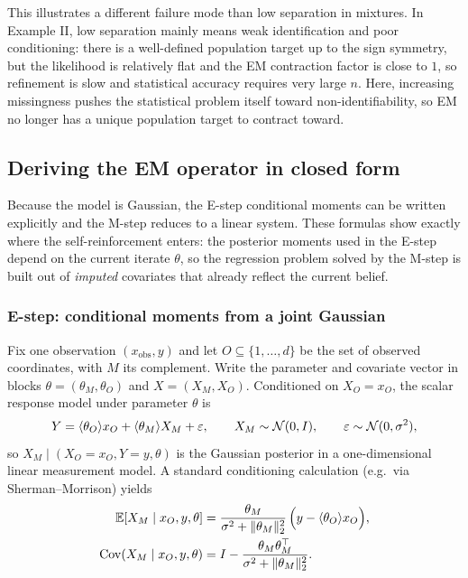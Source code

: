 \documentclass[11pt]{article}
\begin{document}
This illustrates a different failure mode than low separation in mixtures.
In Example II, low separation mainly means weak identification and poor conditioning: there is a well-defined population target up to the sign symmetry, but the likelihood is relatively flat and the EM contraction factor is close to $1$, so refinement is slow and statistical accuracy requires very large $n$.
Here, increasing missingness pushes the statistical problem itself toward non-identifiability, so EM no longer has a unique population target to contract toward.

\subsection{Deriving the EM operator in closed form}
\label{subsec:missing-covariates-derivation}

Because the model is Gaussian, the E-step conditional moments can be written explicitly and the M-step reduces to a linear system.
These formulas show exactly where the self-reinforcement enters:
the posterior moments used in the E-step depend on the current iterate $\theta$, so the regression problem solved by the M-step is built out of \emph{imputed} covariates that already reflect the current belief.

\subsubsection{E-step: conditional moments from a joint Gaussian}
\label{subsubsec:missing-covariates-estep}

Fix one observation $(x_{\mathrm{obs}},y)$ and let $O\subseteq\{1,\dots,d\}$ be the set of observed coordinates, with $M$ its complement.
Write the parameter and covariate vector in blocks $\theta=(\theta_M,\theta_O)$ and $X=(X_M,X_O)$.
Conditioned on $X_O=x_O$, the scalar response model under parameter $\theta$ is
\[
Y = \langle\theta_O\rangle{x_O} + \langle\theta_M\rangle{X_M} + \varepsilon,
\qquad
X_M\sim\mathcal{N}(0,I),
\qquad
\varepsilon\sim\mathcal{N}(0,\sigma^2),
\]
so $X_M\mid (X_O=x_O,Y=y,\theta)$ is the Gaussian posterior in a one-dimensional linear measurement model.
A standard conditioning calculation (e.g.\ via Sherman--Morrison) yields
\begin{align}
\label{eq:missing-covariates-posterior-mean}
\mathbb{E}[X_M\mid x_O,y,\theta]
&=
\frac{\theta_M}{\sigma^2+\lVert\theta_M\rVert_2^2}\,\Big(y-\langle\theta_O\rangle{x_O}\Big), \\
\label{eq:missing-covariates-posterior-cov}
\mathrm{Cov}(X_M\mid x_O,y,\theta)
&=
I-\frac{\theta_M\theta_M^\top}{\sigma^2+\lVert\theta_M\rVert_2^2}.
\end{align}
\end{document}
